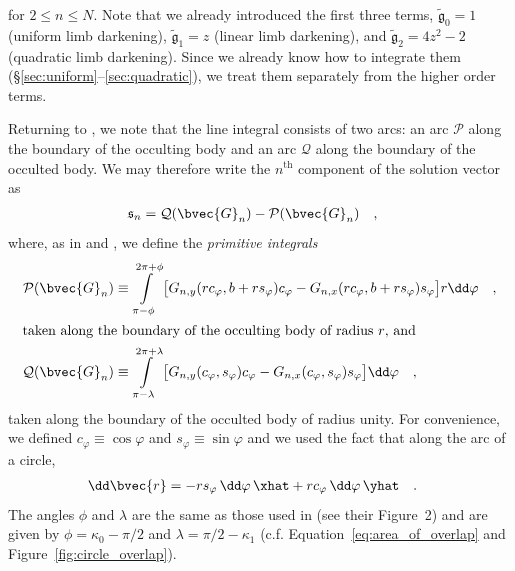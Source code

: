 \documentclass[modern,trackchanges]{aastex63}
\begin{document}
%
for $2 \le n \le N$.
%
Note that we already introduced the first three terms, $\tilde{\mathfrak{g}}_0 = 1$
(uniform limb darkening), $\tilde{\mathfrak{g}}_1 = z$ (linear limb darkening),
and $\tilde{\mathfrak{g}}_2 = 4z^2 - 2$ (quadratic limb darkening).
Since we already know how to integrate them (\S\ref{sec:uniform}--\ref{sec:quadratic}),
we treat them separately from the higher order terms.


Returning to , we note that the line integral consists of two arcs:
an arc $\mathcal{P}$ along the boundary of the occulting body and an arc $\mathcal{Q}$ along the
boundary of the occulted body. We may therefore write the $n^\mathrm{th}$ component of
the solution vector as
%
\begin{align}
    \label{eq:sn}
    \mathfrak{s}_n &= \mathcal{Q}(\bvec{G}_n) - \mathcal{P}(\bvec{G}_n)
    \quad,
\end{align}
%
where, as in \citet{Pal2012} and \citet{starry}, we define the \emph{primitive integrals}
%
\begin{align}
    \label{eq:primitivePdef}
    \mathcal{P}(\bvec{G}_n) &\equiv
    \int\displaylimits_{\pi-\phi}^{2\pi + \phi}
        \big[ G_{n,y}(r c_\varphi, b + r s_\varphi) c_\varphi -
              G_{n,x}(r c_\varphi, b + r s_\varphi) s_\varphi \big] r \dd \varphi \quad,
    \\
\intertext{taken along the boundary of the occulting body of radius $r$, and}
    \label{eq:primitiveQdef}
    \mathcal{Q}(\bvec{G}_n) &\equiv
    \int\displaylimits_{\pi-\lambda}^{2\pi + \lambda}
        \big[ G_{n,y}(c_\varphi, s_\varphi) c_\varphi -
              G_{n,x}(c_\varphi, s_\varphi) s_\varphi \big] \dd \varphi
    \quad,
\end{align}
%
%
taken along the boundary of the occulted body of radius unity.
%
For convenience, we defined
%
$c_\varphi \equiv \cos \varphi$
%
and
%
$s_\varphi \equiv \sin \varphi$
%
and we used the fact that along the arc of a circle,
%
\begin{align}
    \label{eq:dr}
    \dd \bvec{r} &= -r s_\varphi \, \dd \varphi \, \xhat +
                     r c_\varphi \, \dd \varphi \, \yhat
    \quad.
\end{align}
%
The angles $\phi$ and $\lambda$ are the same as those used in
\citet{starry} (see their Figure~2) and are given by
%
$\phi = \kappa_0-\pi/2$ and
$\lambda = \pi/2 - \kappa_1$ (c.f. Equation~\ref{eq:area_of_overlap} and
Figure~\ref{fig:circle_overlap}).
\end{document}
